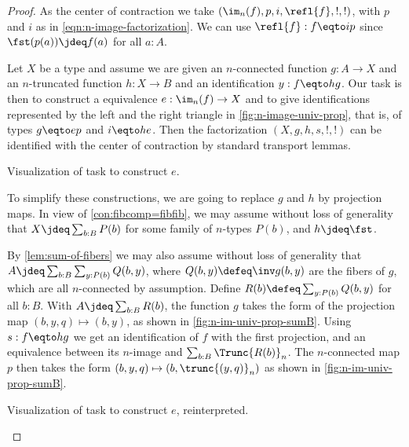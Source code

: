 \begin{proof}
As the center of contraction we take $(\im_n(f),p,i,\refl{f},!,!)$,
with $p$ and $i$ as in \cref{eqn:n-image-factorization}.
We can use $\refl{f} : f \eqto ip$ since $\fst(p(a))\jdeq f(a)$ for all $a:A$.

Let $X$ be a type and assume we are given an $n$-connected
function $g:A\to X$ and an $n$-truncated function $h:X\to B$ 
and an identification $y:f\eqto hg$. Our task is
then to construct a equivalence $e: \im_n(f)\to X$
and to give identifications represented by the left 
and the right triangle in \cref{fig:n-image-univ-prop},
that is, of types $g\eqto ep$ and $i\eqto he$.
Then the factorization $(X,g,h,s,!,!)$ can be identified
with the center of contraction by standard transport lemmas.

\begin{marginfigure}
\noindent{}
\caption{Visualization of task to construct $e$.}
\label{fig:n-image-univ-prop}
\end{marginfigure}

To simplify these constructions,
we are going to replace $g$ and $h$ by projection maps.
In view of \cref{con:fibcomp=fibfib}, we may assume without
loss of generality that $X\jdeq \sum_{b:B} P(b)$ for some
family of $n$-types $P(b)$, and $h\jdeq\fst$.

By \cref{lem:sum-of-fibers} we may also assume without
loss of generality that
$A\jdeq\sum_{b:B}\sum_{y:P(b)} Q(b,y)$, where
$Q(b,y) \defeq\inv g (b,y)$ are the fibers of $g$,
which are all $n$-connected by assumption.
Define $R(b)\defeq\sum_{y:P(b)} Q(b,y)$ for all $b:B$.
With $A\jdeq \sum_{b:B} R(b)$, the function $g$
takes the form of the projection map $(b,y,q)\mapsto(b,y)$,
as shown in \cref{fig:n-im-univ-prop-sumB}.
Using $s: f\eqto hg$ we get an identification of $f$ with the first projection,
and an equivalence between its $n$-image and $\sum_{b:B} \Trunc{R(b)}_n$.
The $n$-connected map $p$ then takes the form
$(b,y,q)\mapsto(b,\trunc{(y,q)}_n)$ as shown in
\cref{fig:n-im-univ-prop-sumB}.

\begin{marginfigure}
  \noindent{}
\caption{Visualization of task to construct $e$, reinterpreted.}
\label{fig:n-im-univ-prop-sumB}
\end{marginfigure}



\end{proof}
